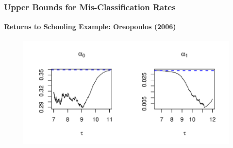 \documentclass{beamer}
\begin{document}
\begin{frame}
  \frametitle{Upper Bounds for Mis-Classification Rates}
  \framesubtitle{Returns to Schooling Example: Oreopoulos (2006)}
  \begin{figure}[h]
    \centering
    \includegraphics[width=\textwidth]{Oreo_CDFbounds}
  \end{figure}
\end{frame}
\end{document}
